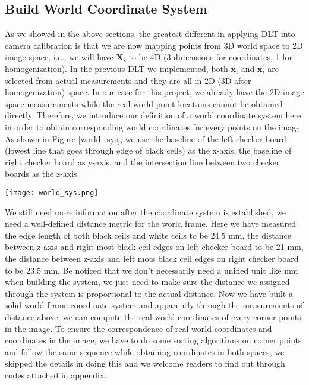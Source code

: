 \documentclass[conference]{IEEEtran}
\newcommand{\mat}[1]{\mathbf{#1}} %
\begin{document}
\subsection{Build World Coordinate System}
As we showed in the above sections, the greatest different in applying DLT into camera calibration is that we are now mapping points from 3D world space to 2D image space, i.e., we will have $\mat{X}_i$ to be 4D (3 dimensions for coordinates, 1 for homogenization). In the previous DLT we implemented, both $\mat{x}_i$ and $\mat{x}_i^\prime$ are selected from actual measurements and they are all in 2D (3D after homogenization) space. In our case for this project, we already have the 2D image space measurements while the real-world point locations cannot be obtained directly. Therefore, we introduce our definition of a world coordinate system here in order to obtain corresponding world coordinates for every points on the image. As shown in Figure \ref{world_sys}, we use the baseline of the left checker board (lowest line that goes through edge of black ceils) as the x-axis, the baseline of right checker board as y-axis, and the intersection line between two checker boards as the z-axis.
\begin{figure*}
  \label{world_sys}
  \centering \texttt{[image: world\_sys.png]}
  \caption{Establishing the World Coordinate System}
\end{figure*}

We still need more information after the coordinate system is established, we need a well-defined distance metric for the world frame. Here we have measured the edge length of both black ceils and white ceils to be 24.5 mm, the distance between z-axis and right most black ceil edges on left checker board to be 21 mm, the distance between z-axis and left mots black ceil edges on right checker board to be 23.5 mm. Be noticed that we don't necessarily need a unified unit like mm when building the system, we just need to make sure the distance we assigned through the system is proportional to the actual distance. Now we have built a solid world frame coordinate system and apparently through the measurements of distance above, we can compute the real-world coordinates of every corner points in the image. To ensure the correspondence of real-world coordinates and coordinates in the image, we have to do some sorting algorithms on corner points and follow the same sequence while obtaining coordinates in both spaces, we skipped the details in doing this and we welcome readers to find out through codes attached in appendix.
\end{document}
